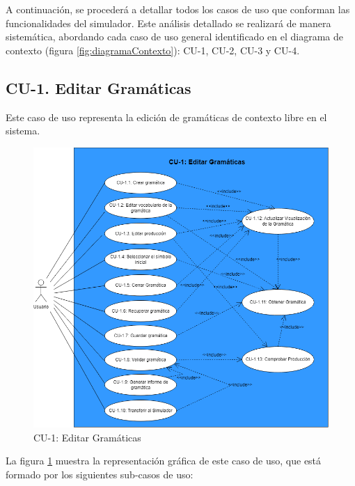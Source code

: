 A continuación, se procederá a detallar todos los casos de uso que conforman las funcionalidades del simulador. Este análisis detallado se realizará de manera sistemática, abordando cada caso de uso general identificado en el diagrama de contexto (figura \ref{fig:diagramaContexto}): CU-1, CU-2, CU-3 y CU-4.


\subsection{CU-1. Editar Gramáticas}

Este caso de uso representa la edición de gramáticas de contexto libre en el sistema. 

  \begin{figure}[H]
       \begin{center} 
 	\includegraphics[scale=0.55]{figuras/Cap7/CU1.png}
 	\caption{CU-1: Editar Gramáticas}
 	\label{fig:CU1_EdicionDeGramatica}
      \end{center}
   \end{figure}

La figura \ref{fig:CU1_EdicionDeGramatica} muestra la representación gráfica de este caso de uso, que está formado por los siguientes sub-casos de uso:

